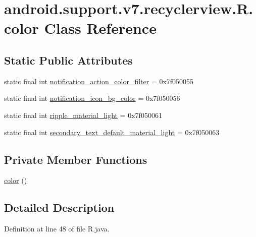\hypertarget{classandroid_1_1support_1_1v7_1_1recyclerview_1_1_r_1_1color}{}\section{android.\+support.\+v7.\+recyclerview.\+R.\+color Class Reference}
\label{classandroid_1_1support_1_1v7_1_1recyclerview_1_1_r_1_1color}
\subsection*{Static Public Attributes}
\begin{DoxyCompactItemize}
\item 
static final int \mbox{\hyperlink{classandroid_1_1support_1_1v7_1_1recyclerview_1_1_r_1_1color_ac2b79744ae8d17aec154a617579653c0}{notification\+\_\+action\+\_\+color\+\_\+filter}} = 0x7f050055
\item 
static final int \mbox{\hyperlink{classandroid_1_1support_1_1v7_1_1recyclerview_1_1_r_1_1color_ad20ca28032de5f2522d2b0f1eb34e96d}{notification\+\_\+icon\+\_\+bg\+\_\+color}} = 0x7f050056
\item 
static final int \mbox{\hyperlink{classandroid_1_1support_1_1v7_1_1recyclerview_1_1_r_1_1color_a379c59cd6fe19f2e4c623f037c0b3db0}{ripple\+\_\+material\+\_\+light}} = 0x7f050061
\item 
static final int \mbox{\hyperlink{classandroid_1_1support_1_1v7_1_1recyclerview_1_1_r_1_1color_ad9cb37541085c24dce097ad0d62c44f0}{secondary\+\_\+text\+\_\+default\+\_\+material\+\_\+light}} = 0x7f050063
\end{DoxyCompactItemize}
\subsection*{Private Member Functions}
\begin{DoxyCompactItemize}
\item 
\mbox{\hyperlink{classandroid_1_1support_1_1v7_1_1recyclerview_1_1_r_1_1color_a2ab1edd95ba1150afc4653b92f6e7429}{color}} ()
\end{DoxyCompactItemize}


\subsection{Detailed Description}


Definition at line 48 of file R.\+java.



